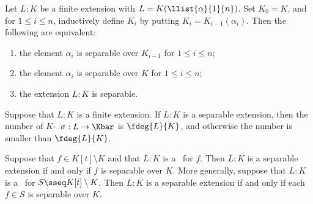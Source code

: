 \documentclass[a4paper]{article}
\begin{document}
\begin{ttheorem}
  Let $ L:K $ be a finite extension with $ L=K(\llist{\alpha}{1}{n}) $.
  Set $ K_0=K $, and for $ 1\leq i\leq n $, inductively define $ K_i $ by putting $ K_i=K_{i-1}(\alpha_i) $.
  Then the following are equivalent: \begin{enumerate}[label=(\roman*)]
    \item the element $ \alpha_i $ is separable over $ K_{i-1} $ for $ 1\leq i\leq n $;
    \item the element $ \alpha_i $ is separable over $ K $ for $ 1\leq i\leq n $;
    \item the extension $ L:K $ is separable.
  \end{enumerate}
\end{ttheorem}

\begin{tcorollary}
  Suppose that $ L:K $ is a finite extension.
  If $ L:K $ is a separable extension, then the number of $ K $-\homo~$ \sigma:L\to\Kbar $ is $ \fdeg{L}{K} $, and otherwise the number is smaller than $ \fdeg{L}{K} $.
\end{tcorollary}

\begin{tcorollary}
  Suppose that $ f\in K[t]\setminus K $ and that $ L:K $ is a \sfe~for $ f $.
  Then $ L:K $ is a separable extension if and only if $ f $ is separable over $ K $.
  More generally, suppose that $ L:K $ is a \sfe~for $ S\sseq K[t]\setminus K $.
  Then $ L:K $ is a separable extension if and only if each $ f\in S $ is separable over $ K $.
\end{tcorollary}
\end{document}
